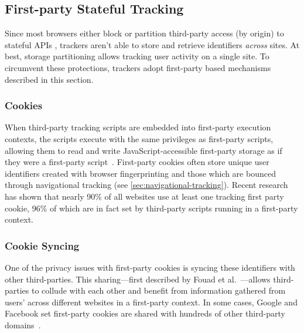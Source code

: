 \vspace{-1mm}
\subsection{First-party Stateful Tracking}
\label{sec:fp-stateful}
\vspace{-2mm}

Since most browsers either block \cite{TrackingPreventionWebKit2020} or partition third-party access (by origin) to stateful APIs \cite{mdnThirdpartyCookiesPrivacy2024}, trackers aren’t able to store and retrieve identifiers \textit{across} sites. 
%
At best, storage partitioning allows tracking user activity on a single site.
%
To circumvent these protections, trackers adopt first-party based mechanisms described in this section.

\vspace{-1mm}
\subsubsection{Cookies}
\label{subsubsec:stateful-tracking-cookies}
When third-party tracking scripts are embedded into first-party execution contexts, the scripts execute with the same privileges as first-party scripts, allowing them to read and write JavaScript-accessible first-party storage as if they were a first-party script~\cite{bahramiCOOKIEGUARDCharacterizingIsolating2024}. 
%
First-party cookies often store unique user identifiers created with browser fingerprinting and those which are bounced through navigational tracking (see \autoref{sec:navigational-tracking}). 
%
Recent research \cite{munirCookieGraphUnderstandingDetecting2023,vekaria2024WebAlmanac2024} has shown that nearly 90\% of all websites use at least one tracking first party cookie, 96\% of which are in fact set by third-party scripts running in a first-party context.


\vspace{-1mm}
\subsubsection{Cookie Syncing}
One of the privacy issues with first-party cookies is syncing these identifiers with other third-parties. 
%
This sharing---first described by Fouad et al.~\cite{fouadMissedFilterLists2020}---allows third-parties to collude with each other and benefit from information gathered from users’ across different websites in a first-party context. 
%
In some cases, Google and Facebook set first-party cookies are shared with hundreds of other third-party domains~\cite{munirCookieGraphUnderstandingDetecting2023,bahramiCOOKIEGUARDCharacterizingIsolating2024}.
%



